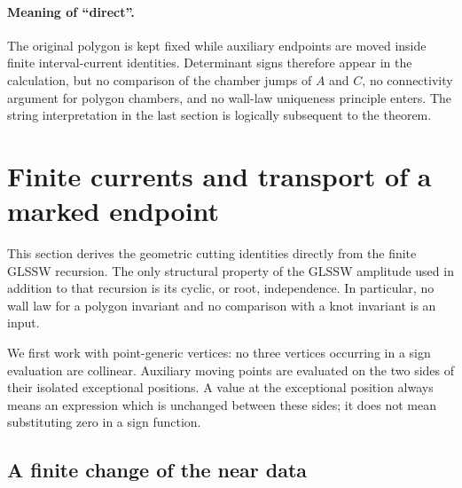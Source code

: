 \documentclass[11pt,letterpaper]{article}
\numberwithin{equation}{section}
\theoremstyle{definition}
\theoremstyle{remark}
\begin{document}
\paragraph{Meaning of ``direct''.}
The original polygon is kept fixed while auxiliary endpoints are moved
inside finite interval-current identities. Determinant signs therefore
appear in the calculation, but no comparison of the chamber jumps of
\(A\) and \(C\), no connectivity argument for polygon chambers, and no
wall-law uniqueness principle enters. The string interpretation in the
last section is logically subsequent to the theorem.

\section{Finite currents and transport of a marked endpoint}
\label{ep:section}

This section derives the geometric cutting identities directly from the
finite GLSSW recursion.  The only structural property of the GLSSW amplitude
used in addition to that recursion is its cyclic, or root, independence.
In particular, no wall law for a polygon invariant and no comparison with a
knot invariant is an input.

We first work with point-generic vertices: no three vertices occurring in a
sign evaluation are collinear.  Auxiliary moving points are evaluated on
the two sides of their isolated exceptional positions.  A value at the
exceptional position always means an expression which is unchanged between
these sides; it does not mean substituting zero in a sign function.

\subsection{A finite change of the near data}
\label{ep:near-data}
\end{document}
